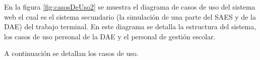 En la figura \ref{fig:casosDeUso2} se muestra el diagrama de casos de uso del sistema web el cual es el sistema secundario (la simulación de una parte del SAES y de la DAE) del trabajo terminal. En este diagrama se detalla la estructura del sistema, los casos de uso personal de la DAE y el personal de gestión escolar.

A continuación se detallan los casos de uso.



\newpage


\newpage


\newpage


\newpage


\newpage


\newpage


\newpage


\newpage


\newpage


\newpage


\newpage


\newpage


\newpage


\newpage


\newpage

%
\newpage


\newpage


\newpage


\newpage


\newpage


\newpage


\newpage


\newpage


\newpage


\newpage


\newpage


\newpage


\newpage


\newpage


\newpage


\newpage


\newpage


\newpage


\newpage






